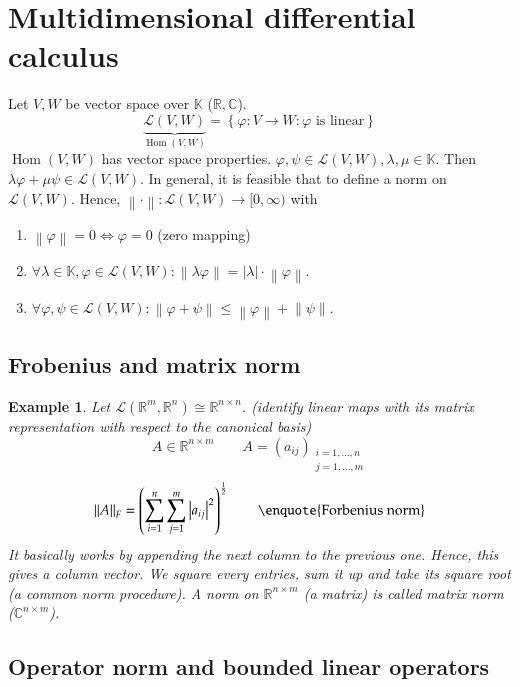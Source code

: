 \documentclass{article}
\newtheorem{example}{Example}  \numberwithin{example}{section}
\newcommand{\set}[1]{\left\{#1\right\}}
\newcommand{\norm}[1]{\left\|#1\right\|}
\newcommand{\card}[1]{\left|#1\right|}
\begin{document}
\section{Multidimensional differential calculus} %

Let $V,W$ be vector space over $\mathbb K$ ($\mathbb R, \mathbb C$).
\[ \underbrace{\mathcal L(V, W)}_{\operatorname{Hom}(V, W)} = \set{\varphi: V \to W: \varphi \text{ is linear}} \]
$\operatorname{Hom}(V, W)$ has vector space properties.
$\varphi, \psi \in \mathcal L(V, W), \lambda, \mu \in \mathbb K$.
Then $\lambda \varphi + \mu \psi \in \mathcal L(V, W)$.
In general, it is feasible that to define a norm on $\mathcal L(V, W)$.
Hence, $\norm{\cdot}: \mathcal L(V, W) \to [0, \infty)$ with
\begin{enumerate}
  \item $\norm{\varphi} = 0 \iff \varphi = 0$ (zero mapping)
  \item $\forall \lambda \in \mathbb K, \varphi \in \mathcal L(V, W): \norm{\lambda \varphi} = \card{\lambda} \cdot \norm{\varphi}$.
  \item $\forall \varphi, \psi \in \mathcal L(V, W): \norm{\varphi + \psi} \leq \norm{\varphi} + \norm{\psi}$.
\end{enumerate}

\subsection{Frobenius and matrix norm}

\begin{example}
  Let $\mathcal L(\mathbb R^m, \mathbb R^n) \cong \mathbb R^{n \times n}$.
  (identify linear maps with its matrix representation with respect to the canonical basis)
  \[ A \in \mathbb R^{n \times m} \qquad A = (a_{ij})_{\substack{i=1,\dots,n \\ j=1,\dots,m}} \]
  \[ \norm{A}_F = \left(\sum_{i=1}^n \sum_{j=1}^m \card{a_{ij}}^2\right)^{\frac12} \qquad \text{\enquote{Forbenius norm}} \]
  It basically works by appending the next column to the previous one. Hence, this gives a column vector. We square every entries, sum it up and take its square root (a common norm procedure).
  A norm on $\mathbb R^{n \times m}$ (a matrix) is called \emph{matrix norm} ($\mathbb C^{n \times m}$).
\end{example}

\subsection{Operator norm and bounded linear operators}
\end{document}
